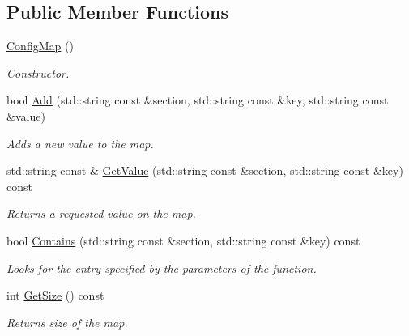 \subsection*{Public Member Functions}
\begin{DoxyCompactItemize}
\item 
\hypertarget{class_common_1_1_config_map_ab77330842979d80d4e36ea9783b085e0}{\hyperlink{class_common_1_1_config_map_ab77330842979d80d4e36ea9783b085e0}{Config\-Map} ()}\label{class_common_1_1_config_map_ab77330842979d80d4e36ea9783b085e0}

\begin{DoxyCompactList}\small\item\em Constructor. \end{DoxyCompactList}\item 
bool \hyperlink{class_common_1_1_config_map_a4a68d6cba9ca84fa4702cdbd45faf487}{Add} (std\-::string const \&section, std\-::string const \&key, std\-::string const \&value)
\begin{DoxyCompactList}\small\item\em Adds a new value to the map. \end{DoxyCompactList}\item 
std\-::string const \& \hyperlink{class_common_1_1_config_map_a6fb312a35a095f2f9b1c1d171f8446d1}{Get\-Value} (std\-::string const \&section, std\-::string const \&key) const 
\begin{DoxyCompactList}\small\item\em Returns a requested value on the map. \end{DoxyCompactList}\item 
bool \hyperlink{class_common_1_1_config_map_a8bffcbff829a85af63db5189e37d0b66}{Contains} (std\-::string const \&section, std\-::string const \&key) const 
\begin{DoxyCompactList}\small\item\em Looks for the entry specified by the parameters of the function. \end{DoxyCompactList}\item 
\hypertarget{class_common_1_1_config_map_a1dbd03a3079d3b79d5c4107e963980e2}{int \hyperlink{class_common_1_1_config_map_a1dbd03a3079d3b79d5c4107e963980e2}{Get\-Size} () const }\label{class_common_1_1_config_map_a1dbd03a3079d3b79d5c4107e963980e2}

\begin{DoxyCompactList}\small\item\em Returns size of the map. \end{DoxyCompactList}\end{DoxyCompactItemize}
